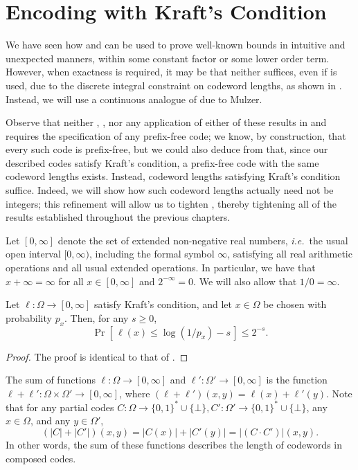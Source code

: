 \chapter{Encoding with Kraft's Condition}

We have seen how  and  can be used to prove
well-known bounds in intuitive and unexpected manners, within some
constant factor or some lower order term. However, when exactness is
required, it may be that neither suffices, even if
 is used, due to the discrete integral
constraint on codeword lengths, as shown in
. Instead, we will use a continuous analogue of
 due to Mulzer.

Observe that neither , , nor any application
of either of these results in  and  requires
the specification of any prefix-free code; we know, by construction,
that every such code is prefix-free, but we could also deduce from
 that, since our described codes satisfy
Kraft's condition, a prefix-free code with the same codeword lengths
exists. Instead, codeword lengths satisfying Kraft's condition
suffice. Indeed, we will show how such codeword lengths actually need
not be integers; this refinement will allow us to tighten
, thereby tightening all of the results established
throughout the previous chapters.

Let $[0, \infty]$ denote the set of extended non-negative real
numbers, \emph{i.e.}~the usual open interval $[0, \infty)$, including
the formal symbol $\infty$, satisfying all real arithmetic operations
and all usual extended operations. In particular, we have that
$x + \infty = \infty$ for all $x \in [0, \infty]$ and
$2^{-\infty} = 0$. We will also allow that $1/0 = \infty$.

\begin{lem}
  Let $\ell : \Omega \to [0, \infty]$ satisfy Kraft's condition, and
  let $x \in \Omega$ be chosen with probability $p_x$. Then, for any
  $s \geq 0$,
  \[\Pr\left[\,\ell(x) \leq \log (1/p_x) - s\,\right] \leq 2^{-s}.\]
\end{lem}
\begin{proof}
  The proof is identical to that of .
\end{proof}

The sum of functions $\ell : \Omega \to [0, \infty]$ and $\ell' :
\Omega' \to [0, \infty]$ is the function $\ell + \ell' : \Omega \times
\Omega' \to [0, \infty]$, where $(\ell + \ell') (x, y) = \ell(x) +
\ell'(y)$. Note that for any partial codes $C : \Omega \to \{0, 1\}^*
\cup \{\bot\}, C' : \Omega' \to \{0, 1\}^* \cup \{\bot\}$, any $x \in
\Omega$, and any $y \in \Omega'$,
\[(|C| + |C'|)(x, y) = |C(x)| + |C'(y)| = |(C \cdot C')|(x, y).\]
In other words, the sum of these functions describes the length of
codewords in composed codes.


